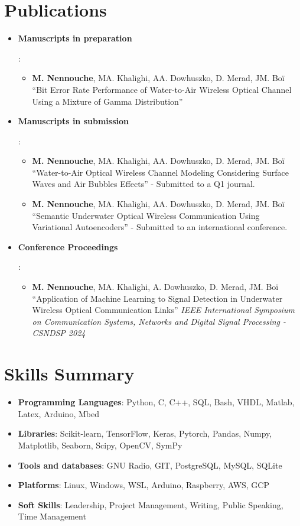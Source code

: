 \documentclass[a4paper,20pt]{article}
\newcommand{\resumeItem}[2]{
  \item\small{
    \textbf{#1}{: #2 \vspace{-2pt}}
  }
}
\newcommand{\resumeSubItem}[2]{\resumeItem{#1}{#2}\vspace{-3pt}}
\newcommand{\resumeSubHeadingListStart}{\begin{itemize}[leftmargin=*]}
\newcommand{\resumeSubHeadingListEnd}{\end{itemize}}
\begin{document}
\section{Publications}
  \resumeSubHeadingListStart
  \resumeSubItem{Manuscripts in preparation}{
    \begin{itemize}
      \item \textbf{M. Nennouche}, MA. Khalighi, AA. Dowhuszko, D. Merad, JM. Boï ``Bit Error Rate Performance of Water-to-Air Wireless Optical Channel Using a Mixture of Gamma Distribution''
    \end{itemize}
  }
  \resumeSubItem{Manuscripts in submission}{
    \begin{itemize}
      \item \textbf{M. Nennouche}, MA. Khalighi, AA.  Dowhuszko, D. Merad, JM. Boï ``Water-to-Air Optical Wireless Channel Modeling Considering Surface Waves and Air Bubbles Effects'' - Submitted to a Q1 journal.
      \item \textbf{M. Nennouche}, MA. Khalighi, AA. Dowhuszko, D. Merad, JM. Boï ``Semantic Underwater Optical Wireless Communication Using Variational Autoencoders'' - Submitted to an international conference.
    \end{itemize}
  }
  \vspace{2pt}
  \resumeSubItem{Conference Proceedings}{
    \begin{itemize}
      \item \textbf{M. Nennouche}, MA. Khalighi, A. Dowhuszko, D. Merad, JM. Boï ``Application of Machine Learning to Signal Detection in Underwater Wireless Optical Communication Links'' \textit{IEEE International Symposium on Communication Systems, Networks and Digital Signal Processing - CSNDSP 2024}
    \end{itemize}
  }
  \resumeSubHeadingListEnd

\vspace{-5pt}
\section{Skills Summary}
	\resumeSubHeadingListStart
    \resumeSubItem{Programming Languages}{Python, C, C++, SQL, Bash, VHDL, Matlab, Latex, Arduino, Mbed} %
    \resumeSubItem{Libraries}{Scikit-learn, TensorFlow, Keras, Pytorch, Pandas, Numpy, Matplotlib, Seaborn, Scipy, OpenCV, SymPy} %
    \resumeSubItem{Tools and databases}{GNU Radio, GIT, PostgreSQL, MySQL, SQLite} %
    \resumeSubItem{Platforms}{Linux, Windows, WSL, Arduino, Raspberry, AWS, GCP}
    \resumeSubItem{Soft Skills}{Leadership, Project Management, Writing, Public Speaking, Time Management}
  \resumeSubHeadingListEnd
\end{document}
